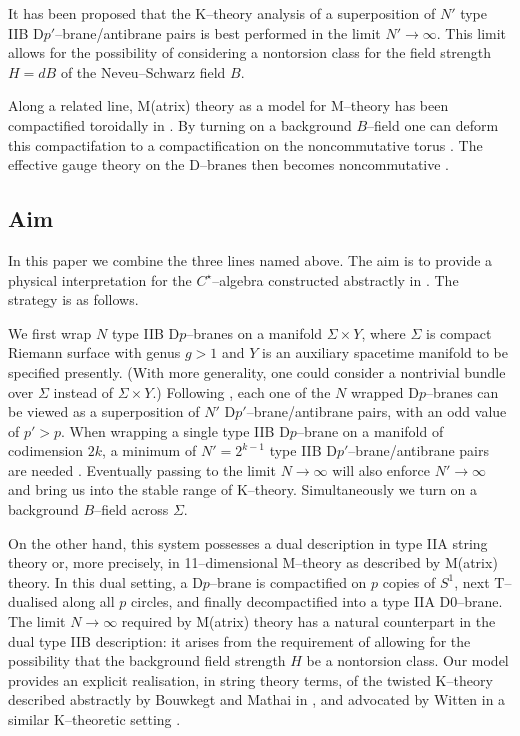 \documentclass[a4paper,a4paper]{article}
\begin{document}
It has been proposed \cite{WITMICHIGAN, BOUWMATHAI} that the K--theory 
analysis of a superposition of $N'$ type IIB D$p'$--brane/antibrane pairs 
is best performed in the limit $N'\rightarrow\infty$. This limit allows 
for the possibility of considering a nontorsion class for the field strength 
$H=dB$ of the Neveu--Schwarz field $B$.   
  
Along a related line, M(atrix) theory \cite{MATRIX, JAP}  
as a model for M--theory has been compactified toroidally in  
\cite{TAYLOR}. By turning on a background $B$--field one can deform 
this compactifation to a compactification on the noncommutative 
torus \cite{CDS, HULL}. The effective gauge theory on the D--branes
then becomes noncommutative \cite{SWn}.   
  
\subsection{Aim}\label{aim}  
  
In this paper we combine the three lines named above. The aim is to provide 
a physical interpretation for the $C^{\star}$--algebra 
constructed abstractly in \cite{PROCEEDINGS}. The strategy is as follows.

We first wrap $N$ type IIB D$p$--branes on a manifold $\Sigma\times Y$,
where $\Sigma$ is compact Riemann surface with genus $g>1$ and $Y$ is an 
auxiliary spacetime manifold to be specified presently.
(With more generality, one could consider a nontrivial bundle over $\Sigma$
instead of $\Sigma\times Y$.)
Following \cite{SEN}, each one of the $N$ wrapped 
D$p$--branes can be viewed as a superposition  of $N'$ D$p'$--brane/antibrane  pairs, 
with an odd value of $p'>p$. When wrapping a single type IIB D$p$--brane on a manifold 
of codimension $2k$, a minimum of $N'=2^{k-1}$ type IIB D$p'$--brane/antibrane pairs 
are needed \cite{WITTENDK}. Eventually passing to the limit $N\rightarrow\infty$ 
will also enforce $N'\rightarrow\infty$ and bring us into the stable range of K--theory. 
Simultaneously we turn on a background $B$--field across $\Sigma$. 

On the other hand, this system possesses a dual description in type IIA  
string theory or, more precisely, in 11--dimensional M--theory as described  
by M(atrix) theory. In this dual setting, a D$p$--brane is compactified on
$p$ copies of $S^1$, next T--dualised along all $p$ circles, and
finally decompactified into a type IIA D0--brane. The limit  $N\rightarrow\infty$ 
required by M(atrix) theory has a natural counterpart in the dual type IIB 
description: it arises from the requirement of allowing for the possibility 
that the background field strength $H$ be a nontorsion class.  
Our model provides an explicit realisation, in string theory terms,  
of the twisted K--theory described abstractly by Bouwkegt and Mathai 
in \cite{BOUWMATHAI}, and advocated by Witten in a similar 
K--theoretic setting \cite{WITMICHIGAN}. 
\end{document}
